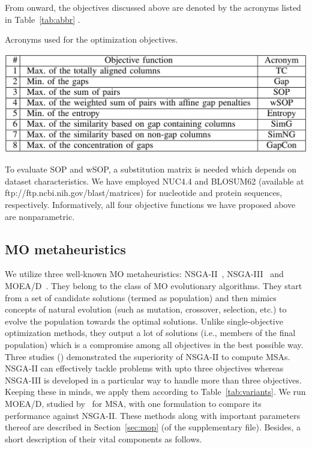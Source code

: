 From onward, the objectives discussed above are denoted by the acronyms listed in Table~\ref{tab:abbr} . 
\begin{table}[!htbp]
	\centering
\caption{Acronyms used for the optimization objectives.}
\includegraphics[width=0.6\columnwidth]{Figure/objective_acronym}
	\label{tab:abbr}\end{table}To evaluate SOP and wSOP, a substitution matrix is needed which depends on dataset characteristics. We have employed NUC4.4 and BLOSUM62 (available at ftp://ftp.ncbi.nih.gov/blast/matrices) for nucleotide and protein sequences, respectively. Informatively, all four objective functions we have proposed above are nonparametric.\subsection{MO metaheuristics}
We utilize three well-known MO metaheuristics: NSGA-II~\citep{deb2002fast}, NSGA-III~\citep{deb2014evolutionary} and MOEA/D~\citep{zhang2007moea}. They belong to the class of MO evolutionary algorithms. They start from a set of candidate solutions (termed as population) and then mimics concepts of natural evolution (such as mutation, crossover, selection, etc.) to evolve the population towards the optimal solutions. Unlike single-objective optimization methods, they output a lot of solutions (i.e., members of the final population) which is a compromise among all objectives in the best possible way. Three studies (\citep{zambrano2017m2align, ortuno2013optimizing, zambrano2017comparing}) demonstrated the superiority of NSGA-II to compute MSAs. NSGA-II can effectively tackle problems with upto three objectives whereas NSGA-III is developed in a particular way to handle more than three objectives. Keeping these in minds, we apply them according to Table~\ref{tab:variants}. We run MOEA/D, studied by~\cite{zhu2015novel} for MSA, with one formulation to compare its performance against NSGA-II.
These methods along with important parameters thereof are described in Section~\ref{sec:mop} (of the supplementary file). Besides, a short description of their vital components as follows. 
